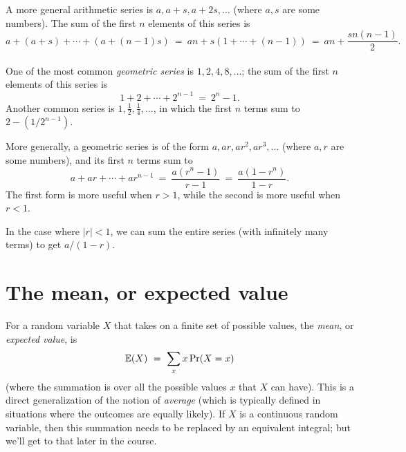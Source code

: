 A more general arithmetic series is $a, a+s, a+2s, \ldots$
(where $a,s$ are some numbers). The sum of the first $n$ elements of this series is
$$ a + (a+s) + \cdots + (a + (n-1)s)
\ = \ 
an + s(1 + \cdots + (n-1))
\ = \ 
an + \frac{sn(n-1)}{2}.
$$
\\

One of the most common {\it geometric series} is $1, 2, 4, 8, \ldots$; the sum
of the first $n$ elements of this series is
$$ 1 + 2 + \cdots + 2^{n-1} \ = \ 2^n - 1 .$$
Another common series is $1, \frac{1}{2}, \frac{1}{4}, \ldots$,
in which the first $n$ terms sum to $2 - (1/2^{n-1})$.

More generally, a geometric series is of the form $a, ar, ar^2, ar^3, \ldots$
(where $a,r$ are some numbers), and its first $n$ terms sum to
$$ a + ar + \cdots + ar^{n-1} 
\ = \ 
\frac{a(r^n-1)}{r-1}
\ = \ 
\frac{a(1-r^n)}{1-r}.$$
The first form is more useful when $r > 1$, while the second is more useful when $r< 1$.

In the case where $|r| < 1$, we can sum the entire series (with infinitely many terms) 
to get $a/(1-r)$.

\section{The mean, or expected value}

For a random variable $X$ that takes on a finite set of possible values, the 
{\it mean}, or {\it expected value}, is
$$ \mathbb{E}(X) \ = \ \sum_{x} x \, \mbox{\rm Pr}(X = x) $$
(where the summation is over all the possible values $x$ that $X$ can have). This
is a direct generalization of the notion of {\it average} (which is typically
defined in situations where the outcomes are equally likely). If $X$ is a continuous 
random variable, then this summation needs to be replaced by an equivalent integral; 
but we'll get to that later in the course.

